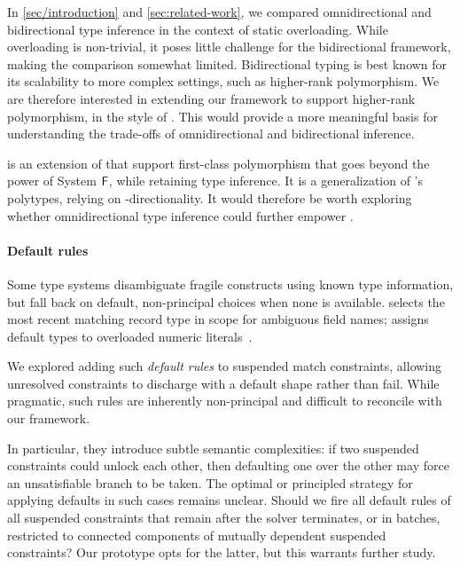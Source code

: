 \documentclass[acmsmall,screen,nonacm,review]{acmart}
\begin{document}
In \cref{sec/introduction} and \cref{sec:related-work}, we compared
omnidirectional and bidirectional type inference in the context of static
overloading. While overloading is non-trivial, it poses little challenge for the
bidirectional framework, making the comparison somewhat limited. Bidirectional
typing is best known for its scalability to more complex settings, such as
higher-rank polymorphism. We are therefore interested in extending our
framework to support higher-rank polymorphism, in the style of
\citet*{dunfield-krishnaswami-bidirectional-poly}. This would provide a more
meaningful basis for understanding the trade-offs of omnidirectional and
bidirectional inference.

\MLF is an extension of \ML that support first-class polymorphism that
goes beyond the power of System $\mathopen{}\mathrel{\mathsf{F}}$, while retaining type inference.
It is a generalization of \OCaml's polytypes, relying on \geninst-directionality.
It would therefore be worth exploring whether omnidirectional type inference
could further empower \MLF.

\paragraph{Default rules}

Some type systems disambiguate fragile constructs using known type information,
but fall back on default, non-principal choices when none is available. \OCaml
selects the most recent matching record type in scope for ambiguous field
names; \SML assigns default types to overloaded numeric
literals~\citep*[Section 5.8]{rossberg-hamlet}.


We explored adding such \emph{default rules} to suspended match constraints,
allowing unresolved constraints to discharge with a default shape rather than
fail. While pragmatic, such rules are inherently non-principal and difficult to
reconcile with our framework.


In particular, they introduce subtle semantic complexities: if two suspended
constraints could unlock each other, then defaulting one over the other
may force an unsatisfiable branch to be taken.
The optimal or principled strategy for applying defaults in such cases
remains unclear.
Should we fire all default rules of all suspended constraints
that remain after the solver terminates, or in batches, restricted to connected
components of mutually dependent suspended constraints?
Our prototype opts for the latter, but this warrants further study.
\end{document}
